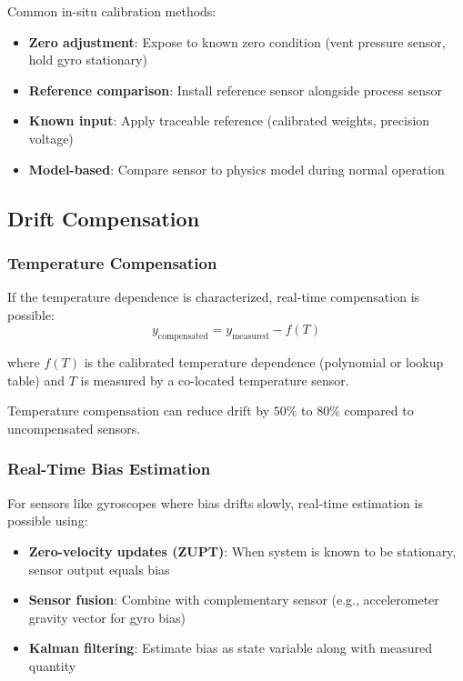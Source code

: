 Common in-situ calibration methods:
\begin{itemize}
    \item \textbf{Zero adjustment}: Expose to known zero condition (vent pressure sensor, hold gyro stationary)
    \item \textbf{Reference comparison}: Install reference sensor alongside process sensor
    \item \textbf{Known input}: Apply traceable reference (calibrated weights, precision voltage)
    \item \textbf{Model-based}: Compare sensor to physics model during normal operation
\end{itemize}

\subsection{Drift Compensation}

\subsubsection{Temperature Compensation}

If the temperature dependence is characterized, real-time compensation is possible:
\begin{equation}
y_{\text{compensated}} = y_{\text{measured}} - f(T)
\label{eq:temp_compensation}
\end{equation}

where $f(T)$ is the calibrated temperature dependence (polynomial or lookup table) and $T$ is measured by a co-located temperature sensor.

Temperature compensation can reduce drift by $50\%$ to $80\%$ compared to uncompensated sensors.

\subsubsection{Real-Time Bias Estimation}

For sensors like gyroscopes where bias drifts slowly, real-time estimation is possible using:
\begin{itemize}
    \item \textbf{Zero-velocity updates (ZUPT)}: When system is known to be stationary, sensor output equals bias
    \item \textbf{Sensor fusion}: Combine with complementary sensor (e.g., accelerometer gravity vector for gyro bias)
    \item \textbf{Kalman filtering}: Estimate bias as state variable along with measured quantity
\end{itemize}

